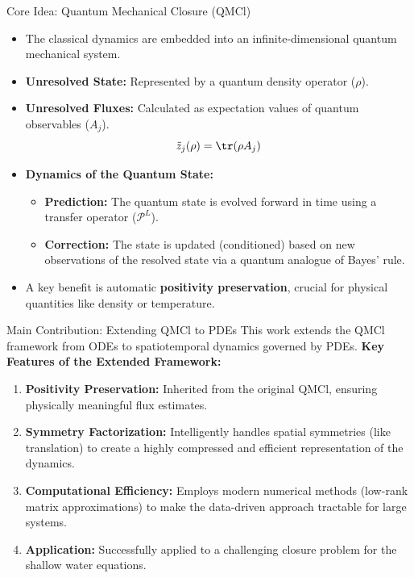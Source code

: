 \documentclass{beamer}
\begin{document}
\begin{frame}{Core Idea: Quantum Mechanical Closure (QMCl)}
    \begin{itemize}
        \item The classical dynamics are embedded into an infinite-dimensional quantum mechanical system.
        \item \textbf{Unresolved State:} Represented by a quantum density operator ($\rho$).
        \item \textbf{Unresolved Fluxes:} Calculated as expectation values of quantum observables ($A_j$).
        \[ \tilde{z}_j(\rho) = \tr(\rho A_j) \]
        \item \textbf{Dynamics of the Quantum State:}
        \begin{itemize}
            \item \textbf{Prediction:} The quantum state is evolved forward in time using a transfer operator ($\mathcal{P}^L$).
            \item \textbf{Correction:} The state is updated (conditioned) based on new observations of the resolved state via a quantum analogue of Bayes' rule.
        \end{itemize}
        \item A key benefit is automatic \textbf{positivity preservation}, crucial for physical quantities like density or temperature.
    \end{itemize}
\end{frame}

\begin{frame}{Main Contribution: Extending QMCl to PDEs}
    This work extends the QMCl framework from ODEs to spatiotemporal dynamics governed by PDEs.
    \vspace{0.5cm}
    \textbf{Key Features of the Extended Framework:}
    \begin{enumerate}
        \item \textbf{Positivity Preservation:} Inherited from the original QMCl, ensuring physically meaningful flux estimates.
        \vspace{0.2cm}
        \item \textbf{Symmetry Factorization:} Intelligently handles spatial symmetries (like translation) to create a highly compressed and efficient representation of the dynamics.
        \vspace{0.2cm}
        \item \textbf{Computational Efficiency:} Employs modern numerical methods (low-rank matrix approximations) to make the data-driven approach tractable for large systems.
        \vspace{0.2cm}
        \item \textbf{Application:} Successfully applied to a challenging closure problem for the shallow water equations.
    \end{enumerate}
\end{frame}
\end{document}
